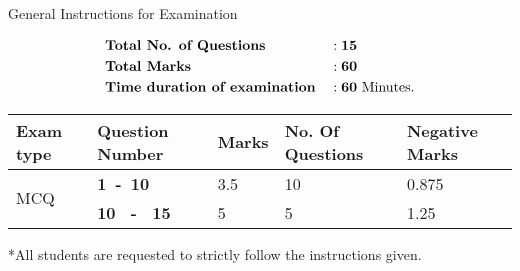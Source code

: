 \begin{abox}
General Instructions for Examination
\end{abox}
\begin{alignat*}{2}
&\text{\textbf{Total  No. of Questions}} &&: \textbf{15}\\
&\text{\textbf{Total Marks}}&&: \textbf{60}\\
&\text{\textbf{Time duration of  examination}} &&: \textbf{60}\ \text{Minutes.}
\end{alignat*}

\begin{table}[H]
	\centering
	 \renewcommand*{\arraystretch}{1.5}
	\begin{tabular}{|p{3cm}|p{3.5cm}|p{2cm}|p{3.2cm}|p{3cm}|}
		\hline
	{\textbf{Exam type}}& \textbf{Question Number}& {\textbf{Marks}}&{\textbf{No. Of Questions}}  & {\textbf{	Negative Marks}}\\\hline
\multirow{2}{*}{MCQ}& \textbf{1\ -\  10}&3.5
&10&{0.875}\\\cline{2-5}
	& \textbf{10 \ - \ 15}&5&5&1.25 \\\hline

	\end{tabular}
\end{table}

\textcolor{ocre}{*All students are requested to strictly follow the instructions given.}


